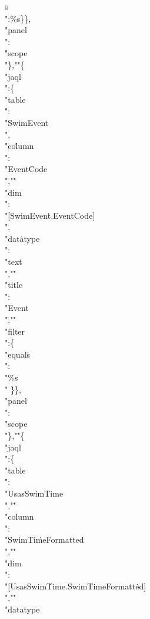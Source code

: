 \.{s\\":\%s\}\},\\"panel\\":\\}\)\.{"scope\\"\},"}\.{"\{\\"jaql\\":\{\\"table%
\\}\)\.{":\\"SwimEvent\\",\\"co}\)\.{lumn\\":\\"EventCode\\"}\)\.{,"}\.{"\\"dim%
\\":\\"[SwimEven}\)\.{t.EventCode]\\",\\"dat}\)\.{atype\\":\\"text\\","}\.{"%
\\"title\\":\\"Event\\"}\)\.{,"}\.{"\\"filter\\":\{\\"equal}\)\.{s\\":\\"\%s\\"%
\}\},\\"panel}\)\.{\\":\\"scope\\"\},"}\.{"\{\\"jaql\\":\{\\"table\\}\)\.{":%
\\"UsasSwimTime\\","}\.{"\\"column\\":\\"SwimTi}\)\.{meFormatted\\","}\.{"%
\\"dim\\":\\"[UsasSwim}\)\.{Time.SwimTimeFormatt}\)\.{ed]\\","}\.{"\\"datatype%
}
